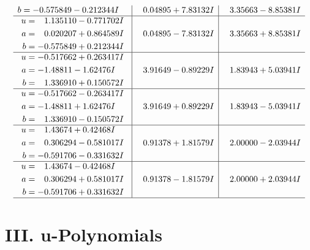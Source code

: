 \documentclass[1p]{elsarticle_modified}
\theoremstyle{definition}
\begin{document}
$$\begin{array}{c|c|c}
\begin{aligned}
b &= -0.575849 - 0.212344 I\end{aligned}
 & \phantom{-}0.04895 + 7.83132 I & \phantom{-}3.35663 - 8.85381 I \\ \hline\begin{aligned}
u &= \phantom{-}1.135110 - 0.771702 I \\
a &= \phantom{-}0.020207 + 0.864589 I \\
b &= -0.575849 + 0.212344 I\end{aligned}
 & \phantom{-}0.04895 - 7.83132 I & \phantom{-}3.35663 + 8.85381 I \\ \hline\begin{aligned}
u &= -0.517662 + 0.263417 I \\
a &= -1.48811 - 1.62476 I \\
b &= \phantom{-}1.336910 + 0.150572 I\end{aligned}
 & \phantom{-}3.91649 - 0.89229 I & \phantom{-}1.83943 + 5.03941 I \\ \hline\begin{aligned}
u &= -0.517662 - 0.263417 I \\
a &= -1.48811 + 1.62476 I \\
b &= \phantom{-}1.336910 - 0.150572 I\end{aligned}
 & \phantom{-}3.91649 + 0.89229 I & \phantom{-}1.83943 - 5.03941 I \\ \hline\begin{aligned}
u &= \phantom{-}1.43674 + 0.42468 I \\
a &= \phantom{-}0.306294 - 0.581017 I \\
b &= -0.591706 - 0.331632 I\end{aligned}
 & \phantom{-}0.91378 + 1.81579 I & \phantom{-}2.00000 - 2.03944 I \\ \hline\begin{aligned}
u &= \phantom{-}1.43674 - 0.42468 I \\
a &= \phantom{-}0.306294 + 0.581017 I \\
b &= -0.591706 + 0.331632 I\end{aligned}
 & \phantom{-}0.91378 - 1.81579 I & \phantom{-}2.00000 + 2.03944 I\\
 \hline 
 \end{array}$$\newpage
\newpage\renewcommand{\arraystretch}{1}
\centering \section*{ III. u-Polynomials}
\end{document}
